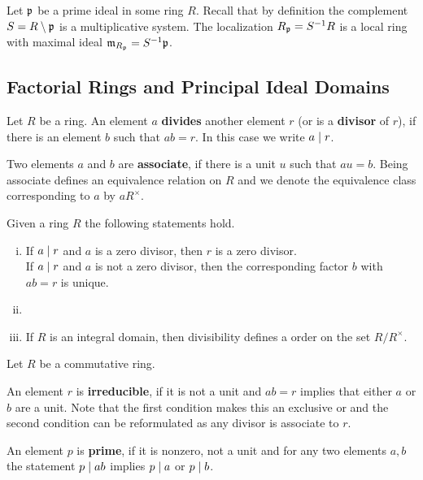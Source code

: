 	\begin{corollary}
		Let $\mathfrak{p}$ be a prime ideal in some ring $R$. Recall that by definition the complement $S = R\setminus \mathfrak{p}$ is a multiplicative system. The localization $R_{\mathfrak{p}} = S^{-1}R$ is a local ring with maximal ideal $\mathfrak{m}_{R_{\mathfrak{p}}} = S^{-1}\mathfrak{p}$.
	\end{corollary}

	\newpage
	\subsection{Factorial Rings and Principal Ideal Domains}

	\begin{definition}
		Let $R$ be a ring. An element $a$ \textbf{divides} another element $r$ (or is a \textbf{divisor} of $r$), if there is an element $b$ such that $ab = r$. In this case we write $a \mid r$.

		Two elements $a$ and $b$ are \textbf{associate}, if there is a unit $u$ such that $au = b$. Being associate defines an equivalence relation on $R$ and we denote the equivalence class corresponding to $a$ by $aR^\times$. 
	\end{definition}

	\begin{lemma}
		Given a ring $R$ the following statements hold.
		\begin{enumerate}[(i)]
			\item{
				If $a \mid r$ and $a$ is a zero divisor, then $r$ is a zero divisor.\\
				If $a \mid r$ and $a$ is not a zero divisor, then the corresponding factor $b$ with $ab = r$ is unique.
			}
			\item{
			}
			\item{
				If $R$ is an integral domain, then divisibility defines a  order on the set $R/R^\times$.
			}
		\end{enumerate}
	\end{lemma}

	\begin{definition}
		Let $R$ be a commutative ring.

		An element $r$ is \textbf{irreducible}, if it is not a unit and $ab = r$ implies that either $a$ or $b$ are a unit. Note that the first condition makes this an exclusive or and the second condition can be reformulated as any divisor is associate to $r$.

		An element $p$ is \textbf{prime}, if it is nonzero, not a unit and for any two elements $a,b$ the statement $p \mid ab$ implies $p \mid a$ or $p \mid b$.
	\end{definition}


